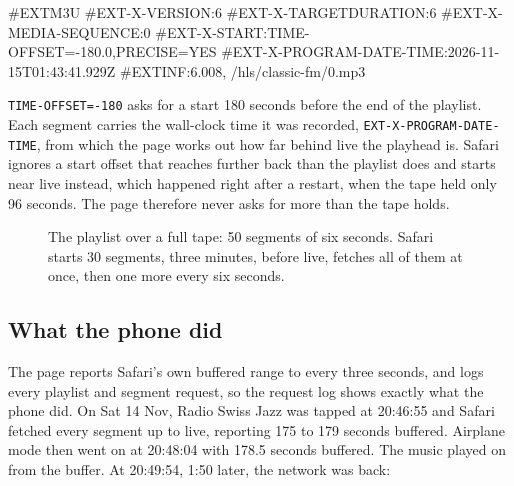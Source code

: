 \documentclass[11pt,a4paper]{article}
\begin{document}
\begin{cmdout}
#EXTM3U
#EXT-X-VERSION:6
#EXT-X-TARGETDURATION:6
#EXT-X-MEDIA-SEQUENCE:0
#EXT-X-START:TIME-OFFSET=-180.0,PRECISE=YES
#EXT-X-PROGRAM-DATE-TIME:2026-11-15T01:43:41.929Z
#EXTINF:6.008,
/hls/classic-fm/0.mp3
\end{cmdout}

\texttt{TIME-OFFSET=-180} asks for a start 180 seconds before the end of the playlist. Each segment carries the wall-clock time it was recorded, \texttt{EXT-X-PROGRAM-DATE-TIME}, from which the page works out how far behind live the playhead is. Safari ignores a start offset that reaches further back than the playlist does and starts near live instead, which happened right after a restart, when the tape held only 96 seconds. The page therefore never asks for more than the tape holds.

\begin{figure}[ht]
\centering
{}
\caption{The playlist over a full tape: 50 segments of six seconds. Safari starts 30 segments, three minutes, before live, fetches all of them at once, then one more every six seconds.}
\label{fig:hls}
\end{figure}

\subsection*{What the phone did}

The page reports Safari's own buffered range to  every three seconds, and  logs every playlist and segment request, so the request log shows exactly what the phone did. On Sat 14 Nov, Radio Swiss Jazz was tapped at 20:46:55 and Safari fetched every segment up to live, reporting 175 to 179 seconds buffered. Airplane mode then went on at 20:48:04 with 178.5 seconds buffered. The music played on from the buffer. At 20:49:54, 1:50 later, the network was back:
\end{document}
